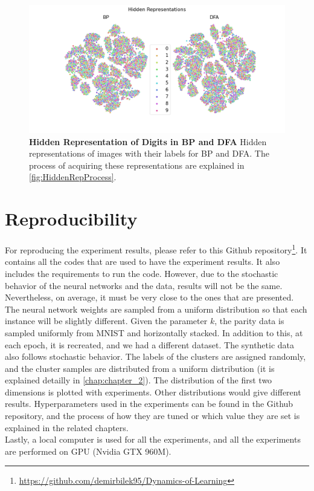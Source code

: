 \documentclass[a4paper, nobind]{templates/ociamthesis}
\newcommand*{\bibtitle}{References}
\begin{document}
\begin{figure}

{\centering \includegraphics[width=1\linewidth]{figures/B_tsne_BPDFA} 

}

\caption[Hidden Representation of Digits in BP and DFA]{\textbf{Hidden Representation of Digits in BP and DFA} \newline Hidden representations of images with their labels for BP and DFA. The process of acquiring these representations are explained in \ref{fig:HiddenRepProcess}.}\label{fig:tSNEBPDFA}
\end{figure}

\hypertarget{reproducibility}{%
\chapter{Reproducibility}\label{reproducibility}}

For reproducing the experiment results, please refer to this Github repository\footnote{\url{https://github.com/demirbilek95/Dynamics-of-Learning}}. It contains all the codes that are used to have the experiment results. It also includes the requirements to run the code. However, due to the stochastic behavior of the neural networks and the data, results will not be the same. Nevertheless, on average, it must be very close to the ones that are presented. The neural network weights are sampled from a uniform distribution so that each instance will be slightly different. Given the parameter \(k\), the parity data is sampled uniformly from MNIST and horizontally stacked. In addition to this, at each epoch, it is recreated, and we had a different dataset. The synthetic data also follows stochastic behavior. The labels of the clusters are assigned randomly, and the cluster samples are distributed from a uniform distribution (it is explained detailly in \ref{chap:chapter_2}). The distribution of the first two dimensions is plotted with experiments. Other distributions would give different results. Hyperparameters used in the experiments can be found in the Github repository, and the process of how they are tuned or which value they are set is explained in the related chapters.\\
Lastly, a local computer is used for all the experiments, and all the experiments are performed on GPU (Nvidia GTX 960M).


\setlength{\baselineskip}{0pt} %

{\renewcommand*\MakeUppercase[1]{#1}%
\printbibliography[heading=bibintoc,title={\bibtitle}]}
\end{document}
